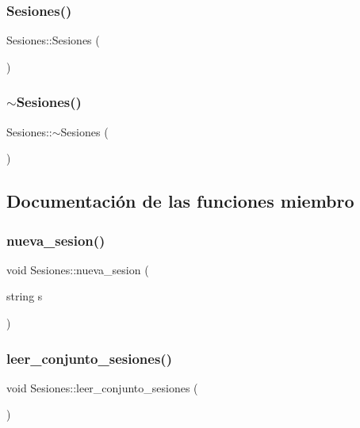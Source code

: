 \subsubsection{\texorpdfstring{Sesiones()}{Sesiones()}}
{\footnotesize\ttfamily Sesiones\+::\+Sesiones (\begin{DoxyParamCaption}{ }\end{DoxyParamCaption})}

\mbox{\label{class_sesiones_ac56862ed0ddea43917e54667173bd21a}} 
\subsubsection{\texorpdfstring{$\sim$\+Sesiones()}{~Sesiones()}}
{\footnotesize\ttfamily Sesiones\+::$\sim$\+Sesiones (\begin{DoxyParamCaption}{ }\end{DoxyParamCaption})}



\subsection{Documentación de las funciones miembro}
\mbox{\label{class_sesiones_a9a08619cdbf3cdc21b7be343c2f05ce4}} 
\subsubsection{\texorpdfstring{nueva\+\_\+sesion()}{nueva\_sesion()}}
{\footnotesize\ttfamily void Sesiones\+::nueva\+\_\+sesion (\begin{DoxyParamCaption}\item[{string}]{s }\end{DoxyParamCaption})}

\mbox{\label{class_sesiones_a88fc086cf1b55ed711f78f143323ad22}} 
\subsubsection{\texorpdfstring{leer\+\_\+conjunto\+\_\+sesiones()}{leer\_conjunto\_sesiones()}}
{\footnotesize\ttfamily void Sesiones\+::leer\+\_\+conjunto\+\_\+sesiones (\begin{DoxyParamCaption}{ }\end{DoxyParamCaption})}

